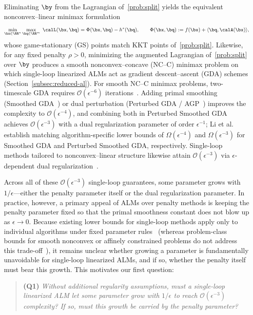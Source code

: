 Eliminating $\by$ from the Lagrangian of~\eqref{prob:split} yields the
equivalent nonconvex--linear minimax formulation
\begin{equation}\label{eq:ncl}
  \min_{\bx\in\RR^n}\max_{\bq\in\RR^m}\;
  \calL(\bx,\bq) = \Phi(\bx,\bq)-h^*(\bq), \qquad
  \Phi(\bx,\bq):=f(\bx)+\langle\bq,\calA(\bx)\rangle,
\end{equation}
whose game-stationary (GS) points match KKT points of~\eqref{prob:split}.
Likewise, for any fixed penalty $\rho>0$, minimizing the augmented Lagrangian
of~\eqref{prob:split} over $\by$ produces a smooth nonconvex--concave (NC--C)
minimax problem on which single-loop linearized ALMs act as gradient
descent--ascent (GDA) schemes (Section~\ref{subsec:reduced-al}). For smooth
NC--C minimax problems, two-timescale GDA requires $\mathcal O(\epsilon^{-6})$
iterations~\cite{lin2020gradient}. Adding primal smoothing (Smoothed
GDA~\cite{zhang2020smoothed}) or dual perturbation (Perturbed GDA /
AGP~\cite{lu2020hybrid,xu2023unified}) improves the complexity to
$\mathcal O(\epsilon^{-4})$, and combining both in Perturbed Smoothed GDA
achieves $\mathcal O(\epsilon^{-3})$ with a dual regularization parameter of
order $\epsilon^{-1}$; Li et al.~\cite{li2026smoothing} establish matching
algorithm-specific lower bounds of $\Omega(\epsilon^{-4})$ and
$\Omega(\epsilon^{-3})$ for Smoothed GDA and Perturbed Smoothed GDA,
respectively. Single-loop methods tailored to nonconvex--linear structure
likewise attain $\mathcal O(\epsilon^{-3})$ via $\epsilon$-dependent dual
regularization~\cite{pan2021efficient,he2024approximation,xu2026rada}.

Across all of these $\mathcal O(\epsilon^{-3})$ single-loop guarantees, some
parameter grows with $1/\epsilon$---either the penalty parameter itself or the
dual regularization parameter. In practice, however, a primary appeal of ALMs
over penalty methods is keeping the penalty parameter fixed so that the primal
smoothness constant does not blow up as $\epsilon\to0$. Because existing lower
bounds for single-loop methods apply only to individual algorithms under fixed
parameter rules~\cite{mahdavinia2022tight,li2026smoothing} (whereas
problem-class bounds for smooth nonconvex or affinely constrained problems do
not address this trade-off~\cite{carmon2020lower,liu2026lower}), it remains
unclear whether growing a parameter is fundamentally unavoidable for
single-loop linearized ALMs, and if so, whether the penalty itself must bear
this growth. This motivates our first question:
\begin{quote}
  \textbf{(Q1)}
  \emph{Without additional regularity assumptions, must a single-loop
  linearized ALM let some parameter grow with $1/\epsilon$ to reach
  $\mathcal O(\epsilon^{-3})$ complexity? If so, must this growth be carried by
  the penalty parameter?}
\end{quote}

